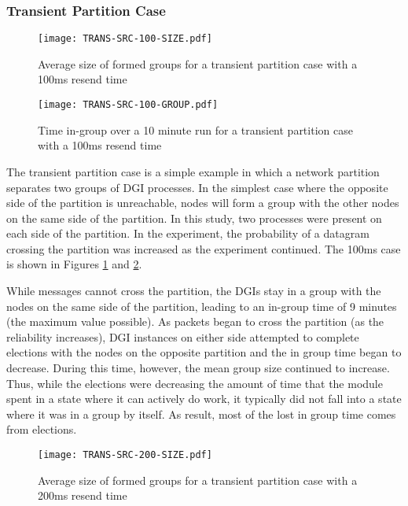 \subsubsection{Transient Partition Case}

\begin{figure}[!h]
\centering
\texttt{[image: TRANS-SRC-100-SIZE.pdf]}
\caption{Average size of formed groups for a transient partition case with a 100ms resend time}
\label{fig:MGS-SRC-TRANS-100}
\end{figure}

\begin{figure}[!h]
\centering
\texttt{[image: TRANS-SRC-100-GROUP.pdf]}
\caption{Time in-group over a 10 minute run for a transient partition case with a 100ms resend time}
\label{fig:IGT-SRC-TRANS-100}
\end{figure}

The transient partition case is a simple example in which a network partition separates two groups of DGI processes. In the simplest case where the opposite side of the partition is unreachable, nodes will form a group with the other nodes on the same side of the partition.
In this study, two processes were present on each side of the partition.
In the experiment, the probability of a datagram crossing the partition was increased as the experiment continued.
The 100ms case is shown in Figures \ref{fig:MGS-SRC-TRANS-100} and \ref{fig:IGT-SRC-TRANS-100}.

While messages cannot cross the partition, the DGIs stay in a group with the nodes on the same side of the partition, leading to an in-group time of 9 minutes (the maximum value possible).
As packets began to cross the partition (as the reliability increases), DGI instances on either side attempted to complete elections with the nodes on the opposite partition and the in group time began to decrease.
During this time, however, the mean group size continued to increase.
Thus, while the elections were decreasing the amount of time that the module spent in a state where it can actively do work, it typically did not fall into a state where it was in a group by itself. 
As result, most of the lost in group time comes from elections.

\begin{figure}[!h]
\centering
\texttt{[image: TRANS-SRC-200-SIZE.pdf]}
\caption{Average size of formed groups for a transient partition case with a 200ms resend time}
\label{fig:MGS-SRC-TRANS-200}
\end{figure}

